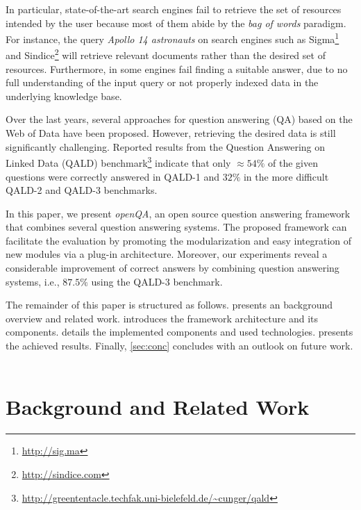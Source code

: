 \documentclass{acm_proc_article-sp}
\begin{document}
In particular, state-of-the-art search engines fail to retrieve the set of resources intended by the user because most of them abide by the \textit{bag of words} paradigm.
For instance, the query \textit{Apollo 14 astronauts} on search engines such as Sigma\footnote{\url{http://sig.ma}} and Sindice\footnote{\url{http://sindice.com}} will retrieve relevant documents rather than the desired set of resources.
Furthermore, in some engines fail finding a suitable answer, due to no full understanding of the input query or not properly indexed data in the underlying knowledge base.

Over the last years, several approaches for question answering (QA) based on the Web of Data have been proposed. 
However, retrieving the desired data is still significantly challenging.
Reported results from the Question Answering on Linked Data (QALD) benchmark\footnote{\url{http://greententacle.techfak.uni-bielefeld.de/~cunger/qald}} indicate that  only $\approx54\%$ of the given questions were correctly answered in QALD-1 and $32\%$ in the more difficult QALD-2 and QALD-3 benchmarks.

In this paper, we present \emph{openQA}, an open source question answering framework that combines several question answering systems.
The proposed framework can facilitate the evaluation by promoting the modularization and easy integration of new modules via a plug-in architecture. 
Moreover, our experiments reveal a considerable improvement of correct answers by combining question answering systems, i.e., $87.5\%$ using the QALD-3 benchmark.

The remainder of this paper is structured as follows.
 presents an background overview and related work.
 introduces the framework architecture and its components.
 details the implemented components and used technologies.
 presents the achieved results.
Finally, \cref{sec:conc} concludes with an outlook on future work.
\\\\
\section{Background and Related Work}\label{sec:rel}
\end{document}

